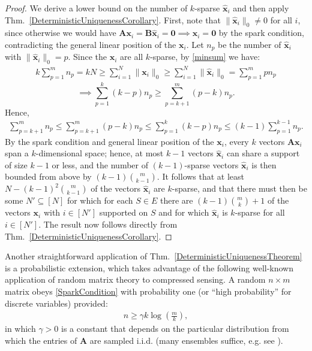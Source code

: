 \documentclass[9pt,twocolumn]{pnas-new}
\begin{document}
\begin{proof}
We derive a lower bound on the number of $k$-sparse $\mathbf{\hat x}_i$ and then apply Thm.~\ref{DeterministicUniquenessCorollary}. 
First, note that $\|\mathbf{\hat x}_i\|_0 \neq 0$ for all $i$, since otherwise we would have $\mathbf{A}\mathbf{x}_i = \mathbf{B}\mathbf{\hat x}_i = \mathbf{0} \implies \mathbf{x}_i = \mathbf{0}$ by the spark condition, contradicting the general linear position of the $\mathbf{x}_i$. Let $n_p$ be the number of $\mathbf{\hat x}_i$ with $\|\mathbf{\hat x}_i\|_0 = p$.  %
Since the $\mathbf{x}_i$ are all $k$-sparse, by \eqref{minsum} we have:
\begin{align}
k \sum_{p = 1}^{m} n_p = kN \geq \sum_{i=1}^N \|\mathbf{x}_i\|_0 \geq \sum_{i=1}^N \|\mathbf{\hat x}_i\|_0 = \sum_{p=1}^{m} p n_p 
\end{align}
\[\implies \sum_{p = 1}^k (k-p)n_p \geq \sum_{p = k+1}^{m} (p-k) n_p.\]
Hence,
\begin{align}
\sum_{p = k+1}^m n_p \leq \sum_{p = k+1}^m (p-k) n_p \leq \sum_{p = 1}^k (k-p)n_p \leq (k-1) \sum_{p = 1}^{k-1} n_p.
\end{align}
By the spark condition and general linear position of the $\mathbf{x}_i$, every $k$ vectors $\mathbf{Ax}_i$ span a $k$-dimensional space; hence, at most $k-1$ vectors $\mathbf{\hat x}_i$ can share a support of size $k-1$ or less, and the number of $(k-1)$-sparse vectors $\mathbf{\hat x}_i$ is then bounded from above by $(k-1) { m \choose k-1}$. It follows that at least $N - (k-1)^2 {m \choose k-1}$ of the vectors $\mathbf{\hat  x}_i$ are $k$-sparse, and that there must then be some $N' \subseteq [N]$ for which for each $S \in E$ there are $(k-1){m \choose k}+1$ of the vectors $\mathbf{x}_i$ with $i \in [N']$ supported on $S$ and for which $\mathbf{\hat x}_i$ is $k$-sparse for all $i \in [N']$.  The result now follows directly from Thm.~\ref{DeterministicUniquenessCorollary}. %
\end{proof}

Another straightforward application of Thm.~\ref{DeterministicUniquenessTheorem} is a probabilistic extension, which takes advantage of the following well-known application of random matrix theory to compressed sensing.  A random $n \times m$ matrix obeys \eqref{SparkCondition} with probability one (or ``high probability'' for discrete variables) 
provided:
\begin{align}\label{CScondition}
n \geq \gamma k\log\left(\frac{m}{k}\right),
\end{align}
in which $\gamma >0$ is a constant that depends on the particular distribution from which the entries of $\mathbf{A}$ are sampled i.i.d. (many ensembles suffice, e.g. see \cite[Sec.~4]{Baraniuk08}). 
\end{document}
